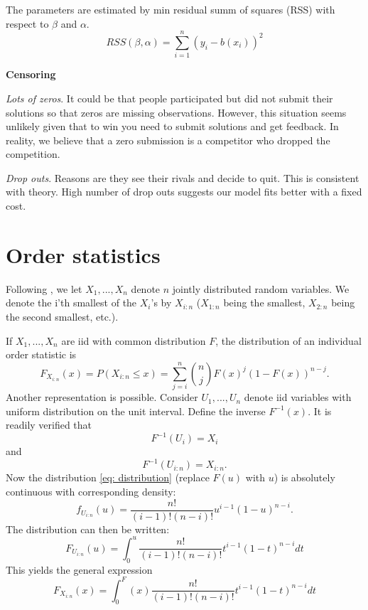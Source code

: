 \documentclass[11pt]{article}
\begin{document}
The parameters are estimated by min residual summ of squares (RSS) with respect to $\beta$ and $\alpha$. 
\begin{equation}
  RSS(\beta, \alpha) = \sum_{i=1}^{n} (y_i - b(x_i))^2
\end{equation}




\textbf{Censoring}

\emph{Lots of zeros}. It could be that people participated but did not submit their solutions so that zeros are missing observations. However, this situation seems unlikely given that to win you need to submit solutions and get feedback. In reality, we believe that a zero submission is a competitor who dropped the competition.

\emph{Drop outs}. Reasons are they see their rivals and decide to quit. This is consistent with theory. High number of drop outs suggests our model fits better with a fixed cost. 

\appendix
\section{Order statistics}
Following \cite{arnold2012relations}, we let $X_1, ..., X_n$ denote $n$ jointly distributed random variables. We denote the i'th smallest of the $X_i$'s by $X_{i:n}$ ($X_{1:n}$ being the smallest, $X_{2:n}$ being the second smallest, etc.). 


If $X_1, ..., X_n$ are iid with common distribution $F$, the distribution of an individual order statistic is
\begin{equation} \label{eq: distribution}
  F_{X_{i:n}} (x) = 
  P(X_{i:n} \leq x) = \sum_{j=i}^{n} \binom{n}{j} F(x)^j (1-F(x))^{n-j}. 
\end{equation}
Another representation is possible. Consider $U_1,...,U_n$ denote iid variables with uniform distribution on the unit interval.  Define the inverse $F^{-1}(x)$. It is readily verified that 
\begin{equation}
  F^{-1}(U_i) = X_i
\end{equation}
and 
\begin{equation}
  F^{-1}(U_{i:n}) = X_{i:n}.
\end{equation}
Now the distribution \eqref{eq: distribution} (replace $F(u)$ with $u$) is absolutely continuous  with corresponding density:
\begin{equation}
  f_{U_{i:n}} (u) = \frac{n!}{(i-1)!(n-i)!} u^{i-1} (1-u)^{n-i}.
\end{equation}
The distribution can then be written:
\begin{equation}
  F_{U_{i:n}} (u) = \int_{0}^u \frac{n!}{(i-1)!(n-i)!} t^{i-1} (1-t)^{n-i} dt
\end{equation}
This yields the general expression
\begin{equation}
  F_{X_{i:n}} (x) = \int_{0}^F(x) \frac{n!}{(i-1)!(n-i)!} t^{i-1} (1-t)^{n-i} dt
\end{equation}
\end{document}
